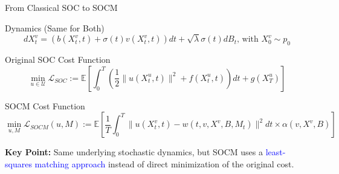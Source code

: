 \documentclass[aspectratio=169,xcolor=dvipsnames]{beamer}
\begin{document}
\begin{frame}{From Classical SOC to SOCM}
    \small
    \begin{block}{Dynamics (Same for Both)}
        \begin{equation}
        dX^v_t = (b(X^v_t, t) + \sigma(t)v(X^v_t, t)) dt + \sqrt{\lambda}\sigma(t) dB_t \text{, with } X^v_0 \sim p_0
        \end{equation}
    \end{block}

    \begin{block}{Original SOC Cost Function}
        \begin{equation}
        \min_{u \in \mathcal{U}} \mathcal{L}_{SOC} := \mathbb{E}\left[\int_0^T \left(\frac{1}{2}\|u(X_t^u, t)\|^2 + f(X_t^u, t)\right) dt + g(X_T^u)\right]
        \end{equation}
    \end{block}

    \begin{alertblock}{SOCM Cost Function}
        \begin{equation}
        \min_{u, M} \mathcal{L}_{SOCM}(u, M) := \mathbb{E}\left[\frac{1}{T}\int_0^T \|u(X^v_t, t) - w(t, v, X^v, B, M_t)\|^2 dt \times \alpha(v, X^v, B)\right]
        \end{equation}
    \end{alertblock}

    \vspace{0.2cm}
    \small
    \textbf{Key Point:} Same underlying stochastic dynamics, but SOCM uses a \textcolor{blue}{least-squares matching approach} instead of direct minimization of the original cost.
\end{frame}
\end{document}
